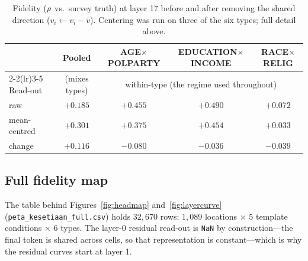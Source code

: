 \label{app:centering}
\begin{table}[t]
\centering\small
\caption{Fidelity ($\rho$ vs.\ survey truth) at layer 17 before and
after removing the shared direction ($v_i \leftarrow v_i - \bar{v}$).
Centering was run on three of the six types; full detail above.}
\label{tab:centering}
\begin{tabular}{lcccc}
\toprule
& Pooled & AGE$\times$POLPARTY & EDUCATION$\times$INCOME & RACE$\times$RELIG\\
\cmidrule(lr){2-2}\cmidrule(lr){3-5}
Read-out & \multicolumn{1}{c}{(mixes types)} & \multicolumn{3}{c}{within-type (the regime used throughout)}\\
\midrule
raw            & $+0.185$ & $+0.455$ & $+0.490$ & $+0.072$ \\
mean-centred   & $+0.301$ & $+0.375$ & $+0.454$ & $+0.033$ \\
\midrule
change & $\mathbf{+0.116}$ & $-0.080$ & $-0.036$ & $-0.039$ \\
\bottomrule
\end{tabular}
\end{table}

\subsection{Full fidelity map}
\label{app:map}
The table behind Figures~\ref{fig:headmap} and~\ref{fig:layercurve} (\texttt{peta\_kesetiaan\_full.csv}) holds
$32{,}670$ rows: $1{,}089$ locations $\times$ 5 template conditions
$\times$ 6 types. The layer-0 residual read-out is \texttt{NaN} by
construction---the final token is shared across cells, so that
representation is constant---which is why the residual curves start at
layer 1.

